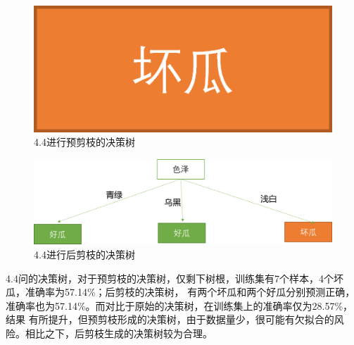 \documentclass{ctexart}
\begin{document}
\begin{figure}[htbp]
    \centering
    \label{fig:4.4.2}
    \includegraphics[scale=1]{images/4.4.2.png}
    \caption{4.4进行预剪枝的决策树}
\end{figure}


\begin{figure}[htbp]
    \centering
    \label{fig:4.4.3}
    \includegraphics[scale=.8]{images/4.4.3.png}
    \caption{4.4进行后剪枝的决策树}
\end{figure}
\newpage
4.4问的决策树，对于预剪枝的决策树，仅剩下树根，训练集有7个样本，4个坏瓜，准确率为57.14\%；后剪枝的决策树，
有两个坏瓜和两个好瓜分别预测正确，准确率也为57.14\%。而对比于原始的决策树，在训练集上的准确率仅为28.57\%，结果
有所提升，但预剪枝形成的决策树，由于数据量少，很可能有欠拟合的风险。相比之下，后剪枝生成的决策树较为合理。
\end{document}
